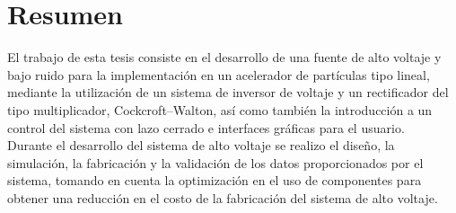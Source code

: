 



\chapter{Resumen} %

El trabajo de esta tesis consiste en el desarrollo de una fuente de alto voltaje y bajo ruido para la implementación en un acelerador de partículas tipo lineal, mediante la utilización  de un sistema de inversor de voltaje y un rectificador del tipo multiplicador, Cockcroft–Walton, así como también la introducción a un control del sistema con lazo cerrado e interfaces gráficas para el usuario.\\

Durante el desarrollo del sistema de alto voltaje se realizo el diseño, la simulación, la fabricación y la validación de los datos proporcionados por el sistema, tomando en cuenta la optimización en el uso de componentes para obtener una reducción en el costo de la fabricación del sistema de alto voltaje.\\

